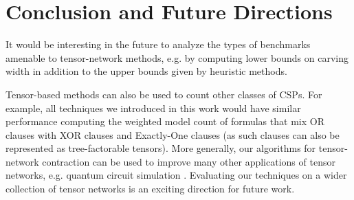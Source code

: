 \chapter{Conclusion and Future Directions}
\label{ch:conclusion}

It would be interesting in the future to analyze the types of benchmarks amenable to tensor-network methods, e.g. by computing lower bounds on carving width in addition to the upper bounds given by heuristic methods. %


Tensor-based methods can also be used to count other classes of CSPs. For example, all techniques we introduced in this work would have similar performance computing the weighted model count of formulas that mix OR clauses with XOR clauses and Exactly-One clauses (as such clauses can also be represented as tree-factorable tensors). More generally, our algorithms for tensor-network contraction can be used to improve many other applications of tensor networks, e.g. quantum circuit simulation \cite{MS08}. Evaluating our techniques on a wider collection of tensor networks is an exciting direction for future work. %


